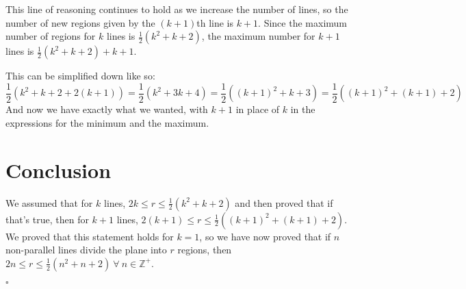 \documentclass[a4paper]{article}
\newcommand{\half}{\frac{1}{2}}
\newcommand{\hexpr}[1]{\half(#1^2 + #1 + 2)}
\begin{document}
\begin{center}
\end{center}

This line of reasoning continues to hold as we increase the number of lines, so the number of new regions given by the $(k + 1)$th line is $k + 1$. Since the maximum number of regions for $k$ lines is $\half(k^2 + k + 2)$, the maximum number for $k + 1$ lines is $\hexpr{k} + k + 1$.

This can be simplified down like so: \[\half(k^2 + k + 2 + 2(k + 1)) = \half(k^2 + 3k + 4) = \half((k + 1)^2 + k + 3) = \hexpr{(k + 1)}\] And now we have exactly what we wanted, with $k + 1$ in place of $k$ in the expressions for the minimum and the maximum.

\section{Conclusion}

We assumed that for $k$ lines, $2k \leq r \leq \hexpr{k}$ and then proved that if that's true, then for $k + 1$ lines, $2(k + 1) \leq r \leq \hexpr{(k + 1)}$. We proved that this statement holds for $k = 1$, so we have now proved that if $n$ non-parallel lines divide the plane into $r$ regions, then $2n \leq r \leq \hexpr{n}\ \forall\ n \in \mathbb{Z}^+$.

\hspace{\fill}$\square$
\end{document}
